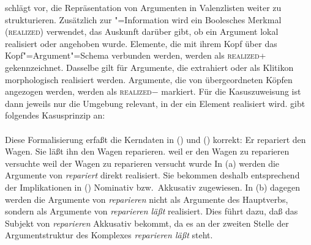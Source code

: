 \prz schlägt vor, die Repräsentation von Argumenten in Valenzlisten
weiter zu strukturieren. Zusätzlich zur "=Information wird
ein Boolesches Merkmal (\textsc{realized}\label{page-realized}) verwendet,
das Auskunft darüber gibt, ob ein Argument lokal realisiert 
oder angehoben wurde. Elemente, die mit ihrem Kopf über das Kopf"=Argument"=Schema
verbunden werden, werden als \textsc{realized}+ gekennzeichnet. Dasselbe gilt
für Argumente, die extrahiert oder als Klitikon
morphologisch realisiert werden.
Argumente, die von übergeordneten Köpfen angezogen werden, werden als
\textsc{realized}$-$ markiert. Für die Kasuszuweisung ist dann jeweils nur
die Umgebung relevant, in der ein Element realisiert wird.
\citet[]{Prze99} gibt folgendes Kasusprinzip an:
\eal
\label{case-prz}
\ex {} \impl \\
    \mbox{}\hspace{3cm}
\ex {} \impl \\
    \mbox{}\hspace{3cm}
\zl
Diese Formalisierung erfaßt die Kerndaten in () und () korrekt:
\eal
\ex Er repariert den Wagen.
\ex Sie läßt ihn den Wagen reparieren.
\zl
\eal
\ex weil er den Wagen zu reparieren versuchte
\ex weil der Wagen zu reparieren versucht wurde
\zl
In (a) werden die Argumente von \emph{repariert} direkt realisiert.
Sie bekommen deshalb entsprechend der Implikationen in () Nominativ
bzw.\ Akkusativ zugewiesen. In (b) dagegen werden die Argumente von
\emph{reparieren} nicht als Argumente des Hauptverbs, sondern als Argumente
von \emph{reparieren läßt} realisiert. Dies führt dazu, daß das Subjekt
von \emph{reparieren} Akkusativ bekommt, da es an der zweiten Stelle
der Argumentstruktur des Komplexes \emph{reparieren läßt} steht.

